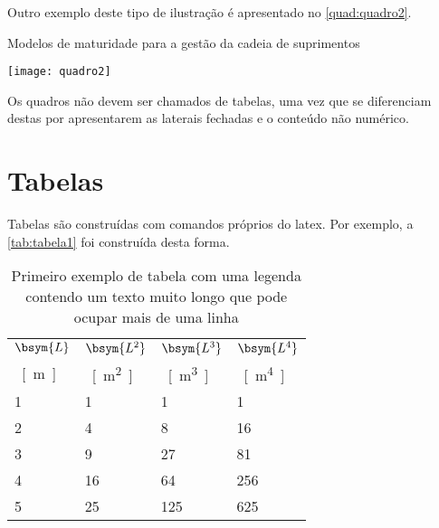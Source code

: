 Outro exemplo deste tipo de ilustração é apresentado no \autoref{quad:quadro2}.

\begin{tabframed}[htb]%
    \caption{Modelos de maturidade para a gestão da cadeia de suprimentos}%
    \label{quad:quadro2}%
    \texttt{[image: quadro2]}%
\end{tabframed}

Os quadros não devem ser chamados de tabelas, uma vez que se diferenciam destas por apresentarem as laterais fechadas e o conteúdo não numérico.

\section{Tabelas}\label{sec:tabelas}

Tabelas são construídas com comandos próprios do \gls{latex}. Por exemplo, a \autoref{tab:tabela1} foi construída desta forma.

\begin{table}[htb]%
    \caption{Primeiro exemplo de tabela com uma legenda contendo um texto muito longo que pode ocupar mais de uma linha}%
    \label{tab:tabela1}%
    \begin{tabularx}{\textwidth}{@{\extracolsep{\fill}}llll}%
        \toprule
        $\bsym{L}$ & $\bsym{L^2}$ & $\bsym{L^3}$ & $\bsym{L^4}$ \\
        \SI{}{[m]} & \SI{}{[m^2]} & \SI{}{[m^3]} & \SI{}{[m^4]} \\ \midrule
        1          & 1            & 1            & 1            \\
        2          & 4            & 8            & 16           \\
        3          & 9            & 27           & 81           \\
        4          & 16           & 64           & 256          \\
        5          & 25           & 125          & 625          \\ \bottomrule
    \end{tabularx}
    \fonte{}%
\end{table}

